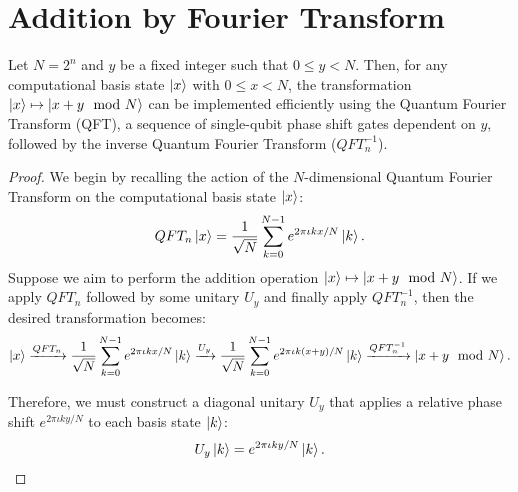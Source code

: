 \section{Addition by Fourier Transform}

\begin{theorem}
Let $N=2^n$ and $y$ be a fixed integer such that $0 \leq y < N$. Then, for any computational basis state $\ket{x}$ with $0 \leq x < N$, the transformation $\ket{x} \mapsto \ket{x + y \mod N}$ can be implemented efficiently using the Quantum Fourier Transform (QFT), a sequence of single-qubit phase shift gates dependent on $y$, followed by the inverse Quantum Fourier Transform ($QFT_n^{-1}$).
\end{theorem}

\begin{proof}
We begin by recalling the action of the $N$-dimensional Quantum Fourier Transform on the computational basis state $\ket{x}$:
\begin{equation}
    QFT_n\ket{x} = \frac{1}{\sqrt{N}} \sum_{k=0}^{N-1} e^{2\pi\iota kx/N} \ket{k}.
    \label{eq:qft_n_theorem}
\end{equation}
Suppose we aim to perform the addition operation $\ket{x} \mapsto \ket{x + y \mod N}$. If we apply $QFT_n$ followed by some unitary $U_y$ and finally apply $QFT_n^{-1}$, then the desired transformation becomes:
\[
\ket{x} \xrightarrow{QFT_n} \frac{1}{\sqrt{N}} \sum_{k=0}^{N-1} e^{2\pi\iota kx/N} \ket{k} \xrightarrow{U_y} \frac{1}{\sqrt{N}} \sum_{k=0}^{N-1} e^{2\pi\iota k(x + y)/N} \ket{k} \xrightarrow{QFT_n^{-1}} \ket{x + y \mod N}.
\]

Therefore, we must construct a diagonal unitary $U_y$ that applies a relative phase shift $e^{2\pi\iota ky/N}$ to each basis state $\ket{k}$:
\begin{equation}
    U_y\ket{k} = e^{2\pi\iota ky/N} \ket{k}.
    \label{eq:qft_addn_theorem}
\end{equation}


\end{proof}
